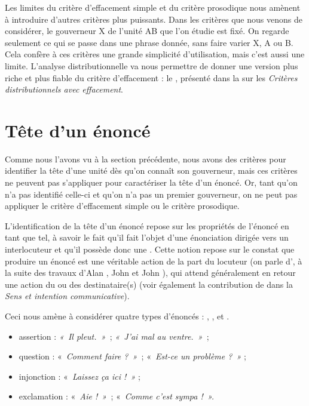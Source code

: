 \begin{sloppypar}
Les limites du critère d’effacement simple et du critère prosodique nous amènent à introduire d’autres critères plus puissants. Dans les critères que nous venons de considérer, le gouverneur X de l’unité AB que l’on étudie est fixé. On regarde seulement ce qui se passe dans une phrase donnée, sans faire varier X, A ou B. Cela confère à ces critères une grande simplicité d’utilisation, mais c’est aussi une limite. L’analyse distributionnelle va nous permettre de donner une version plus riche et plus fiable du critère d’effacement : le , présenté dans la  sur les \textit{Critères distributionnels avec effacement}.
\end{sloppypar}

\section{Tête d’un énoncé}\label{sec:3.3.8}

Comme nous l’avons vu à la section précédente, nous avons des critères pour identifier la tête d’une unité dès qu’on connaît son gouverneur, mais ces critères ne peuvent pas s’appliquer pour caractériser la tête d’un énoncé. Or, tant qu’on n’a pas identifié celle-ci et qu’on n’a pas un premier gouverneur, on ne peut pas appliquer le critère d’effacement simple ou le critère prosodique.

L’identification de la tête d’un énoncé repose sur les propriétés de l’énoncé en tant que tel, à savoir le fait qu’il fait l’objet d’une énonciation dirigée vers un interlocuteur et qu’il possède donc une . Cette notion repose sur le constat que produire un énoncé est une véritable action de la part du locuteur (on parle d’, à la suite des travaux d'Alan \citet{gardiner1932speech}, John \citet{austin1962how} et John \citet{searle1969speech}), qui attend généralement en retour une action du ou des destinataire(s) (voir également la contribution de \citet{bloomfield1933language} dans la  \textit{Sens et intention communicative}).

Ceci nous amène à considérer quatre types d’énoncés : , ,  et .

\begin{itemize}
\item assertion : \textit{«~Il pleut.~»~}; \textit{«~J’ai mal au ventre.~»~};
\item question : «~\textit{Comment faire ?~»~}; «~\textit{Est-ce un problème ?~»} ;
\item injonction : «~\textit{Laissez ça ici !~»} ;
\item exclamation : «~\textit{Aie !~»~}; «~\textit{Comme c’est sympa !~».}
\end{itemize}

